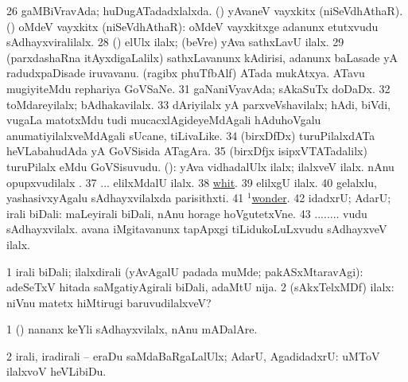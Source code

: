 \num{26}  gaMBiVravAda; huDugATadadxlalxda. 
  
\banum
{} (\sanA) yAvaneV vayxkitx (niSeVdhAthaR). 
 (\gu) oMdeV vayxkitx (niSeVdhAthaR):  oMdeV vayxkitxge adanunx etutxvudu sAdhayxviralilalx. 
\eanum
\numie
\num{28}  (\ame) elUlx ilalx; (beVre) yAva sathxLavU ilalx. 
\num{29} (parxdashaRna itAyxdigaLalilx) sathxLavanunx kAdirisi, adanunx baLasade yA radudxpaDisade iruvavanu. 
  
\banum
{} (ragibx phuTfbAlf) ATada mukAtxya. 
 ATavu mugiyiteMdu rephariya GoVSaNe. 
\eanum
\numie
\num{31}  gaNaniVyavAda; sAkaSuTx doDaDx. 
\num{32}  toMdareyilalx; bAdhakavilalx. 
\num{33}  dAriyilalx yA parxveVshavilalx; hAdi, biVdi, \mo vugaLa matotxMdu tudi mucacxlAgideyeMdAgali hAduhoVgalu anumatiyilalxveMdAgali sUcane, tiLivaLike. 
\num{34}  (birxDfDx) turuPilalxdATa heVLabahudAda yA GoVSisida ATagAra. 
\num{35} (birxDfjx isipxVTATadalilx) turuPilalx eMdu GoVSisuvudu. 
 (\AmA): 
\banum
{} yAva vidhadalUlx ilalx; ilalxveV ilalx. 
 nAnu opupxvudilalx \mo. 
\eanum
\numie
\num{37} ... elilxMdalU ilalx. 
\num{38}  \hyperref{kandict_w.pdf}{W}{whit pagu(2)}{whit}. 
\num{39}  elilxgU ilalx. 
\num{40}  gelalxlu, yashasivxyAgalu sAdhayxvilalxda parisithxti. 
\num{41}  \hyperref{kandict_w.pdf}{W}{wonder(1) pagu(6)}{$^1$wonder}. 
\num{42}  idadxrU; AdarU; irali biDali:  maLeyirali biDali, nAnu horage hoVgutetxVne. 
\num{43} ........ vudu sAdhayxvilalx.  avana iMgitavanunx tapApxgi tiLidukoLuLxvudu sAdhayxveV ilalx. 
\enum
\emng
\eentry

\bentry
{}
\gl{\kirxvi}
\bmng
\bnum
\num{1} irali biDali; ilalxdirali (yAvAgalU  padada muMde; pakASxMtaravAgi):  adeSeTxV hitada saMgatiyAgirali biDali, adaMtU nija. 
\num{2} (sAkxTelxMDf) ilalx:  niVnu matetx hiMtirugi baruvudilalxveV? 
\enum
\emng

\noindent
\gl{\pagu}
\bmng
\bnum
\num{1} (\AmA)  nananx keYli sAdhayxvilalx, nAnu mADalAre. 
\num{2}  irali, iradirali -- eraDu saMdaBaRgaLalUlx; AdarU, AgadidadxrU:  uMToV ilalxvoV heVLibiDu. 
\enum
\emng
\eentry

